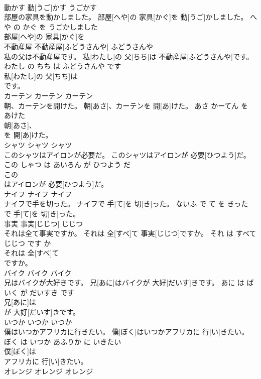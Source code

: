 \documentclass[8pt]{extreport}
\begin{document}
\begin{CJK}{UTF8}{min}
\\	動かす	動[うご]かす	うごかす	
\\	部屋の家具を動かしました。	部屋[へや]の 家具[かぐ]を 動[うご]かしました。	へや の かぐ を うごかしました	
\\	部屋[へや]の 家具[かぐ]を
\\	不動産屋	不動産屋[ふどうさんや]	ふどうさんや	
\\	私の父は不動産屋です。	私[わたし]の 父[ちち]は 不動産屋[ふどうさんや]です。	わたし の ちち は ふどうさんや です	
\\	私[わたし]の 父[ちち]は
\\	です。			
\\	カーテン	カーテン	カーテン	
\\	朝、カーテンを開けた。	朝[あさ]、カーテンを 開[あ]けた。	あさ かーてん を あけた	
\\	朝[あさ]、
\\	を 開[あ]けた。			
\\	シャツ	シャツ	シャツ	
\\	このシャツはアイロンが必要だ。	このシャツはアイロンが 必要[ひつよう]だ。	この しゃつ は あいろん が ひつよう だ	
\\	この
\\	はアイロンが 必要[ひつよう]だ。			
\\	ナイフ	ナイフ	ナイフ	
\\	ナイフで手を切った。	ナイフで 手[て]を 切[き]った。	ないふ で て を きった	
\\	で 手[て]を 切[き]った。			
\\	事実	事実[じじつ]	じじつ	
\\	それは全て事実ですか。	それは 全[すべ]て 事実[じじつ]ですか。	それ は すべて じじつ です か	
\\	それは 全[すべ]て
\\	ですか。			
\\	バイク	バイク	バイク	
\\	兄はバイクが大好きです。	兄[あに]はバイクが 大好[だいす]きです。	あに は ばいく が だいすき です	
\\	兄[あに]は
\\	が 大好[だいす]きです。			
\\	いつか	いつか	いつか	
\\	僕はいつかアフリカに行きたい。	僕[ぼく]はいつかアフリカに 行[い]きたい。	ぼく は いつか あふりか に いきたい	
\\	僕[ぼく]は
\\	アフリカに 行[い]きたい。			
\\	オレンジ	オレンジ	オレンジ	

\end{CJK}
\end{document}
